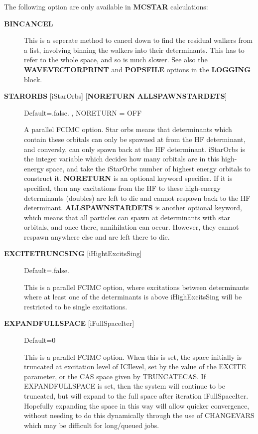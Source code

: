 \documentclass[openany,a4paper,10pt,english]{manual}
\begin{document}
The following option are only available in \textbf{MCSTAR} calculations:
\begin{description}
\item[\textbf{BINCANCEL}] \leavevmode
This is a seperate method to cancel down to find the residual
walkers from a list, involving binning the walkers into their
determinants. This has to refer to the whole space, and so is
much slower.  See also the \textbf{WAVEVECTORPRINT} and \textbf{POPSFILE}
options in the \textbf{LOGGING} block.

\item[\textbf{STARORBS} {[}iStarOrbs{]} {[}\textbf{NORETURN} \textbar{} \textbf{ALLSPAWNSTARDETS}{]}] \leavevmode
Default=.false. , NORETURN = OFF

A parallel FCIMC option. Star orbs means that determinants which
contain these orbitals can only be spawned at from the HF determinant,
and conversly, can only spawn back at the HF determinant. iStarOrbs is
the integer variable which decides how many orbitals are in this high-
energy space, and take the iStarOrbs number of highest energy orbitals
to construct it. \textbf{NORETURN} is an optional keyword specifier. If it
is specified, then any excitations from the HF to these high-energy
determinants (doubles) are left to die and cannot respawn back to the
HF determinant. \textbf{ALLSPAWNSTARDETS} is another optional keyword, which
means that all particles can spawn at determinants with star orbitals, and
once there, annihilation can occur. However, they cannot respawn anywhere
else and are left there to die.

\item[\textbf{EXCITETRUNCSING} {[}iHightExcitsSing{]}] \leavevmode
Default=.false.

This is a parallel FCIMC option, where excitations between determinants where
at least one of the determinants is above iHighExcitsSing will be restricted to be single excitations.

\item[\textbf{EXPANDFULLSPACE} {[}iFullSpaceIter{]}] \leavevmode
Default=0

This is a parallel FCIMC option. When this is set, the space initially is truncated at excitation level of ICIlevel,
set by the value of the EXCITE parameter, or the CAS space given by TRUNCATECAS. If EXPANDFULLSPACE is set, then the
system will continue to be truncated, but will
expand to the full space after iteration iFullSpaceIter.
Hopefully expanding the space in this way will allow quicker
convergence, without needing to do this dynamically through the use of CHANGEVARS which may be difficult for
long/queued jobs.

\end{description}
\end{document}
